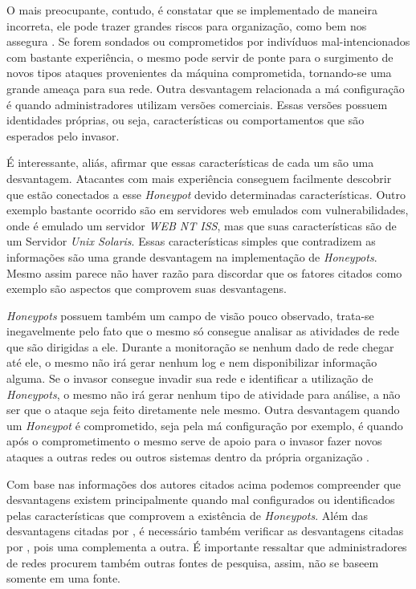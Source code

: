 O mais preocupante, contudo, é constatar que se implementado de maneira incorreta, ele pode trazer grandes riscos para organização, como bem nos assegura . Se forem sondados ou comprometidos por indivíduos mal-intencionados com bastante experiência, o mesmo pode servir de ponte para o surgimento de novos tipos ataques provenientes da máquina comprometida, tornando-se uma grande ameaça para sua rede. Outra desvantagem relacionada a má configuração é quando administradores utilizam versões comerciais. Essas versões possuem identidades próprias, ou seja, características ou comportamentos que são esperados pelo invasor.

É interessante, aliás, afirmar que essas características de cada um são uma desvantagem. Atacantes com mais experiência conseguem facilmente descobrir que estão conectados a esse \textit{Honeypot} devido determinadas características. Outro exemplo bastante ocorrido são em servidores web emulados com vulnerabilidades, onde é emulado um servidor \textit{WEB NT ISS}, mas que suas características são de um Servidor \textit{Unix Solaris}. Essas características simples que contradizem as informações são uma grande desvantagem na implementação de \textit{Honeypots}. Mesmo assim parece não haver razão para discordar que os fatores citados como exemplo são aspectos que comprovem suas desvantagens.

\textit{Honeypots} possuem também um campo de visão pouco observado, trata-se inegavelmente pelo fato que o mesmo só consegue analisar as atividades de rede que são dirigidas a ele. Durante a monitoração se nenhum dado de rede chegar até ele, o mesmo não irá gerar nenhum log e nem disponibilizar informação alguma. Se o invasor consegue invadir sua rede e identificar a utilização de \textit{Honeypots}, o mesmo não irá gerar nenhum tipo de atividade para análise, a não ser que o ataque seja feito diretamente nele mesmo. Outra desvantagem quando um \textit{Honeypot} é comprometido, seja pela má configuração por exemplo, é quando após o comprometimento o mesmo serve de apoio para o invasor fazer novos ataques a outras redes ou outros sistemas dentro da própria organização \cite{spitzner2003}.

Com base nas informações dos autores citados acima podemos compreender que desvantagens existem principalmente quando mal configurados ou identificados pelas características que comprovem a existência de \textit{Honeypots}. Além das desvantagens citadas por , é necessário também verificar as desvantagens citadas por , pois uma complementa a outra. É importante ressaltar que administradores de redes procurem também outras fontes de pesquisa, assim, não se baseem somente em uma fonte.

